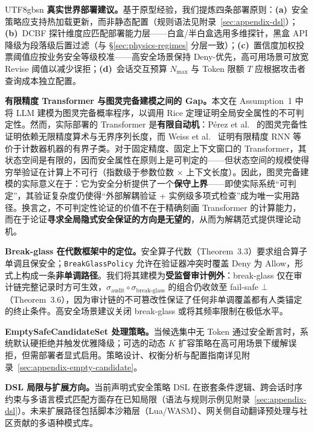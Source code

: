 \documentclass[letterpaper,twocolumn,10pt]{article}
\begin{document}
\begin{CJK}{UTF8}{gbsn}
\textbf{真实世界部署建议。}基于原型经验，我们提炼四条部署原则：\textbf{(a)}~安全策略应支持热加载更新，而非静态配置（规则语法见附录~\ref{sec:appendix-dsl}）；\textbf{(b)}~DCBF 探针维度应匹配部署能力层——白盒/半白盒选用多维探针，黑盒 API 降级为段落级后置过滤（与 \S\ref{sec:physics-regimes} 分层一致）；\textbf{(c)}~置信度加权投票阈值应按业务安全等级校准——高安全场景保持 Deny-优先，高可用场景可放宽 Revise 阈值以减少误拒；\textbf{(d)}~会话交互预算 $N_{\max}$ 与 Token 限额 $T$ 应根据攻击者查询成本独立配置。

\textbf{有限精度 Transformer 与图灵完备建模之间的 Gap。}本文在 Assumption~1 中将 LLM 建模为图灵完备概率程序，以调用 Rice 定理证明全局安全属性的不可判定性。然而，实际部署的 Transformer 是\textbf{有限自动机}：P\'{e}rez et al.~\cite{perez-turing-2021} 的图灵完备性证明依赖无限精度算术与无界序列长度，而 Weiss et al.~\cite{weiss-rnn-counter-2018} 证明有限精度 RNN 等价于计数器机器的有界子类。对于固定精度、固定上下文窗口的 Transformer，其状态空间是有限的，因而安全属性在原则上是可判定的——但状态空间的规模使得穷举验证在计算上不可行（指数级于参数位数 $\times$ 上下文长度）。因此，图灵完备建模的实际意义在于：它为安全分析提供了一个\textbf{保守上界}——即使实际系统``可判定''，其验证复杂度仍使得``外部解耦验证 + 实例级多项式检查''成为唯一实用路径。换言之，不可判定性论证的价值不在于精确刻画 Transformer 的计算能力，而在于论证\textbf{寻求全局隐式安全保证的方向是无望的}，从而为解耦范式提供理论动机。

\textbf{Break-glass 在代数框架中的定位。}安全算子代数（Theorem~3.3）要求组合算子单调且保安全；\texttt{BreakGlassPolicy} 允许在验证器冲突时覆盖 Deny 为 Allow，形式上构成一条\textbf{非单调路径}。我们将其建模为\textbf{受监督审计例外}：break-glass 仅在审计链完整记录时方可生效，$\sigma_{\mathrm{audit}} \circ \sigma_{\mathrm{break\text{-}glass}}$ 的组合仍收敛至 fail-safe $\bot$（Theorem~3.6），因为审计链的不可篡改性保证了任何非单调覆盖都有人类锚定的终止条件。高安全场景建议关闭 break-glass 或将其频率限制在极低水平。

\textbf{EmptySafeCandidateSet 处理策略。}当候选集中无 Token 通过安全断言时，系统默认硬拒绝并触发优雅降级；可选的动态 $K$ 扩容策略在高可用场景下缓解误拒，但需部署者显式启用。策略设计、权衡分析与配置指南详见附录~\ref{sec:appendix-empty-candidate}。

\textbf{DSL 局限与扩展方向。}当前声明式安全策略 DSL 在嵌套条件逻辑、跨会话时序约束与多语言模式匹配方面存在已知局限（语法与规则示例见附录~\ref{sec:appendix-dsl}）。未来扩展路径包括脚本沙箱层（Lua/WASM）、网关侧自动翻译预处理与社区贡献的多语种模式库。


\end{CJK}
\end{document}
